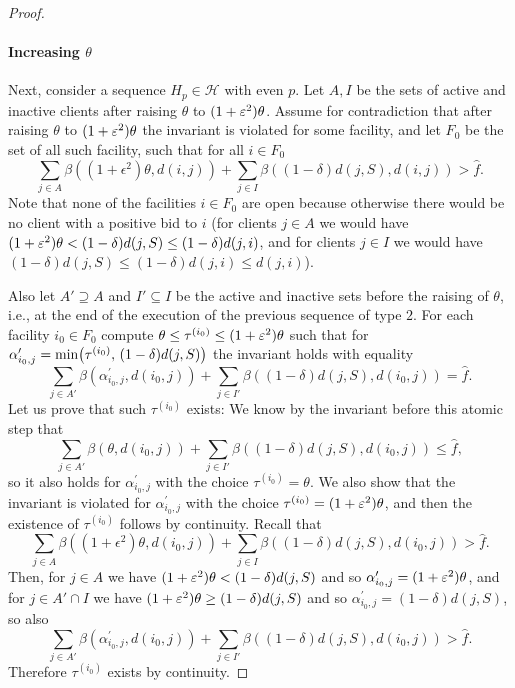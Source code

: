 \begin{proof}
\paragraph{Increasing $\theta$}
Next, consider a sequence $H_p \in \mathcal{H}$ with even $p$.
Let $A, I$ be the sets of active and inactive clients after raising $\theta$ to $(1+\varepsilon^2)\theta$.
Assume for contradiction that after raising $\theta$ to $(1+\varepsilon^2)\theta$ the invariant is violated for some facility, and let $F_0$ be the set of all such facility, such that for all $i \in F_0$
\[
    \sum_{j \in A} \beta((1+\epsilon^2)\theta, d(i,j)) + \sum_{j \in I} \beta((1-\delta)d(j, S), d(i,j)) > \hat f.
\]
Note that none of the facilities $i \in F_0$ are open because otherwise there would be no client with a positive bid to $i$ (for clients $j \in A$ we would have $(1+\varepsilon^2)\theta < (1-\delta)d(j,S) \leq (1-\delta)d(j, i)$, and for clients $j \in I$ we would have $(1-\delta)d(j,S) \leq (1-\delta)d(j,i) \leq d(j, i)$).

Also let $A' \supseteq A$ and $I' \subseteq I$ be the active and inactive sets before the raising of $\theta$, i.e., at the end of the execution of the previous sequence of type $2$.
For each facility $i_0 \in F_0$ compute $\theta \le \tau^{(i_0)} \le (1+\varepsilon^2)\theta$ such that for $\alpha^\prime_{i_0,j} = \min\bigl(\tau^{(i_0)},\,(1-\delta)d(j,S)\bigr)$ the invariant holds with equality
\[
    \sum_{j \in A'} \beta(\alpha^\prime_{i_0,j}, d(i_0,j)) + \sum_{j \in I'} \beta((1-\delta)d(j, S), d(i_0,j)) = \hat f.
\]
Let us prove that such $\tau^{(i_0)}$ exists: We know by the invariant before this atomic step that
\[\sum_{j \in A'} \beta(\theta, d(i_0,j)) + \sum_{j \in I'} \beta((1-\delta)d(j, S), d(i_0,j)) \leq \hat f,\]
so it also holds for $\alpha^\prime_{i_0,j}$ with the choice $\tau^{(i_0)} = \theta$.
We also show that the invariant is violated for $\alpha^\prime_{i_0,j}$ with the choice $\tau^{(i_0)} = (1+\varepsilon^2)\theta$, and then the existence of $\tau^{(i_0)}$ follows by continuity.
Recall that
\[\sum_{j \in A} \beta((1+\epsilon^2)\theta, d(i_0,j)) + \sum_{j \in I} \beta((1-\delta)d(j, S), d(i_0,j)) > \hat f.\]
Then, for $j \in A$ we have $(1+\varepsilon^2)\theta < (1-\delta)d(j,S)$ and so $\alpha^\prime_{i_0,j} = (1+\varepsilon^2)\theta$, and for $j \in A' \cap I$ we have $(1+\varepsilon^2)\theta \geq (1-\delta) d(j,S)$ and so $\alpha^\prime_{i_0,j} = (1-\delta)d(j,S)$, so also
\[\sum_{j \in A'} \beta(\alpha^\prime_{i_0,j}, d(i_0,j)) + \sum_{j \in I'} \beta((1-\delta)d(j, S), d(i_0,j)) > \hat f.\]
Therefore $\tau^{(i_0)}$ exists by continuity.


\end{proof}
